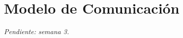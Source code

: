 \documentclass[12pt,a4paper,twoside,spanish]{article}      %
\begin{document}
\section{Modelo de Comunicación}

\textit{Pendiente: semana 3.}

\end{document}
